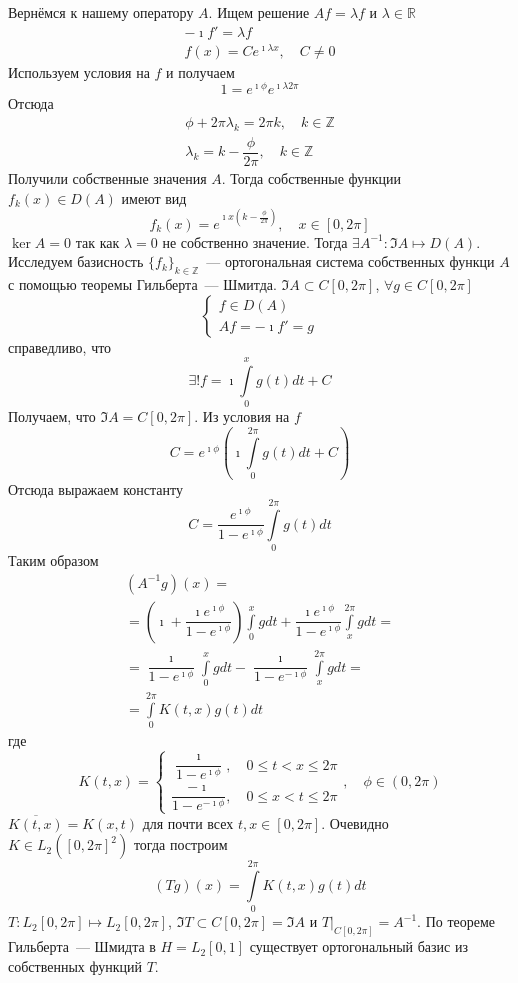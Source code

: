 \documentclass[14pt]{extarticle}
\begin{document}
\begin{Prim}
    Вернёмся к нашему оператору $A$.
    Ищем решение $Af = \lambda f$ и $\lambda \in \mathbb R$
    \begin{gather*}
        -\imath f' = \lambda f\\
        f(x) = C e^{\imath \lambda x},\quad C \neq 0
    \end{gather*}
    Используем условия на $f$ и получаем
    $$
    1 = e^{\imath \phi} e^{\imath \lambda 2 \pi}
    $$
    Отсюда
    \begin{gather*}
        \phi + 2 \pi \lambda_k = 2 \pi k,\quad k \in \mathbb Z\\
        \lambda_k = k - \dfrac{\phi}{2\pi},\quad k \in \mathbb Z
    \end{gather*}
    Получили собственные значения $A$.
    Тогда собственные функции $f_k(x) \in D(A)$ имеют вид
    $$
    f_k(x) = e^{\imath x (k - \frac{\phi}{2\pi})},\quad x \in [0, 2\pi]
    $$
    $\ker A = 0$ так как $\lambda = 0$ не собственно значение.
    Тогда $\exists A^{-1} : \Im A \mapsto D(A)$.
    Исследуем базисность $\{f_k\}_{k \in \mathbb Z}$~--- ортогональная система собственных 
    функци $A$ с помощью теоремы Гильберта~--- Шмитда.
    $\Im A \subset C[0, 2\pi]$, $\forall g \in C[0,2\pi]$
    $$
    \left\{
    \begin{array}{l}
        f \in D(A)\\
        Af = -\imath f' = g
    \end{array}
    \right.
    $$
    справедливо, что
    $$
    \exists! f = \imath \int\limits_0^x g(t) dt + C
    $$
    Получаем, что $\Im A = C[0,2\pi]$.
    Из условия на $f$
    $$
    C = e^{\imath \phi}\left(\imath \int\limits_0^{2\pi} g(t) dt + C\right)
    $$
    Отсюда выражаем константу
    $$
    C = \dfrac{e^{\imath \phi}}{1 - e^{\imath \phi}} \int\limits_0^{2\pi} g(t) dt
    $$
    Таким образом
    \begin{multline*}
    (A^{-1}g)(x) =\\= \left(\imath + \dfrac{\imath e^{\imath \phi}}{1 - e^{\imath \phi}}\right)
    \int\limits_0^x g dt + \dfrac{\imath e^{\imath \phi}}{1 - e^{\imath \phi}}\int\limits_x^{2\pi}g dt
    =\\= \dfrac{\imath}{1 - e^{\imath \phi}} \int\limits_0^x g dt - \dfrac{\imath}{1 - e^{-\imath 
    \phi}} \int\limits_x^{2\pi} g dt =\\= \int\limits_0^{2\pi}K(t, x)g(t)dt
    \end{multline*}
    где
    $$
    K(t, x) = \left\{
    \begin{array}{l}
        \dfrac{\imath}{1 - e^{\imath \phi}}, \quad 0 \le t < x \le 2\pi\\
        \dfrac{-\imath}{1 - e^{-\imath \phi}}, \quad 0 \le x < t \le 2\pi
    \end{array}
    \right., \quad \phi \in (0, 2\pi)
    $$
    $\overline{K(t, x)} = K(x, t)$ для почти всех $t, x \in [0, 2\pi]$.
    Очевидно $K \in L_2([0,2\pi]^2)$ тогда построим
    $$
    (Tg)(x) = \int\limits_0^{2 \pi}K(t, x)g(t)dt
    $$
    $T : L_2[0,2\pi] \mapsto L_2[0,2\pi]$, $\Im T \subset C[0,2\pi] = \Im A$ и $T|_{C[0,2\pi]} = 
    A^{-1}$.
    По теореме Гильберта~--- Шмидта в $H = L_2[0, 1]$ существует ортогональный базис из
    собственных функций $T$.
    

\end{Prim}
\end{document}
